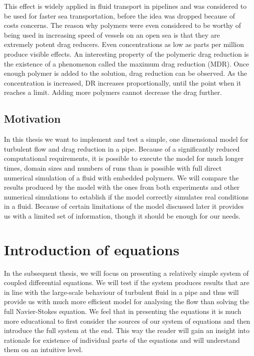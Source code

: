 \documentclass[11pt,a4paper]{article}
\begin{document}
This effect is widely applied in fluid transport in pipelines\cite{Graham04} and was considered to be used for faster sea transportation\cite{Dimotakis03}, before the idea was dropped because of costs concerns.
The reason why polymers were even considered to be worthy of being used in increasing speed of vessels on an open sea is that they are extremely potent drag reducers.
Even concentrations as low as parts per million produce visible effects.
An interesting property of the polymeric drag reduction is the existence of a phenomenon called the maximum drag reduction (MDR).
Once enough polymer is added to the solution, drag reduction can be observed.
As the concentration is increased, DR increases proportionally, until the point when it reaches a limit.
Adding more polymers cannot decrease the drag further.

\subsection{Motivation}
In this thesis we want to implement and test a simple, one dimensional model for turbulent flow and drag reduction in a pipe.
Because of a significantly reduced computational requirements, it is possible to execute the model for much longer times, domain sizes and numbers of runs than is possible with full direct numerical simulation of a fluid with embedded polymers.
We will compare the results produced by the model with the ones from both experiments and other numerical simulations to establish if the model correctly simulates real conditions in a fluid.
Because of certain limitations of the model discussed later it provides us with a limited set of information, though it should be enough for our needs.

\section{Introduction of equations}
In the subsequent thesis, we will focus on presenting a relatively simple system of coupled differential equations.
We will test if the system produces results that are in line with the large-scale behaviour of turbulent fluid in a pipe and thus will provide us with much more efficient model for analysing the flow than solving the full Navier-Stokes equation.
We feel that in presenting the equations it is much more educational to first consider the sources of our system of equations and then introduce the full system at the end.
This way the reader will gain an insight into rationale for existence of individual parts of the equations and will understand them on an intuitive level.
\end{document}
